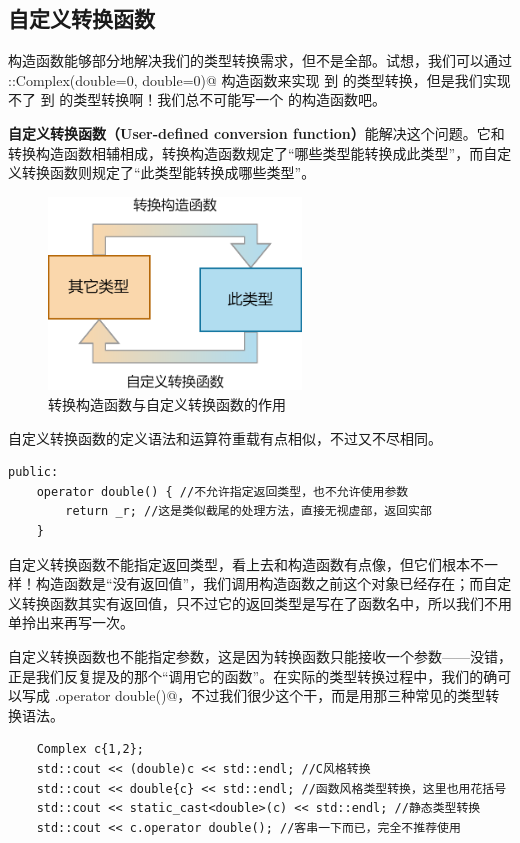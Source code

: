 \subsection*{自定义转换函数}
构造函数能够部分地解决我们的类型转换需求，但不是全部。试想，我们可以通过 \lstinline@Complex::Complex(double={0}, double={0})@ 构造函数来实现 \lstinline@double@ 到 \lstinline@Complex@ 的类型转换，但是我们实现不了 \lstinline@Complex@ 到 \lstinline@double@ 的类型转换啊！我们总不可能写一个 \lstinline@double@ 的构造函数吧。\par
\textbf{自定义转换函数（User-defined conversion function）}能解决这个问题。它和转换构造函数相辅相成，转换构造函数规定了``哪些类型能转换成此类型''，而自定义转换函数则规定了``此类型能转换成哪些类型''。
\begin{figure}[htbp]
    \centering
    \includegraphics[width=0.6\textwidth]{../images/generalized_parts/08_type_conversion_between_classes_300.png}
    \caption{转换构造函数与自定义转换函数的作用}
\end{figure}
自定义转换函数的定义语法和运算符重载有点相似，不过又不尽相同。
\begin{lstlisting}
public:
    operator double() { //不允许指定返回类型，也不允许使用参数
        return _r; //这是类似截尾的处理方法，直接无视虚部，返回实部
    }
\end{lstlisting}
自定义转换函数不能指定返回类型，看上去和构造函数有点像，但它们根本不一样！构造函数是``没有返回值''，我们调用构造函数之前这个对象已经存在；而自定义转换函数其实有返回值，只不过它的返回类型是写在了函数名中，所以我们不用单拎出来再写一次。\par
自定义转换函数也不能指定参数，这是因为转换函数只能接收一个参数——没错，正是我们反复提及的那个``调用它的函数''。在实际的类型转换过程中，我们的确可以写成 \lstinline@c.operator double()@，不过我们很少这个干，而是用那三种常见的类型转换语法。
\begin{lstlisting}
    Complex c{1,2};
    std::cout << (double)c << std::endl; //C风格转换
    std::cout << double{c} << std::endl; //函数风格类型转换，这里也用花括号
    std::cout << static_cast<double>(c) << std::endl; //静态类型转换
    std::cout << c.operator double(); //客串一下而已，完全不推荐使用
\end{lstlisting}\par
